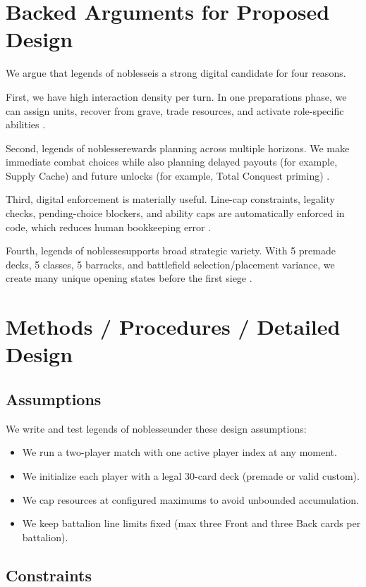 \documentclass[12pt]{article}
\newcommand{\GameName}{legends of noblesse}
\begin{document}
\section{Backed Arguments for Proposed Design}
We argue that \GameName is a strong digital candidate for four reasons.

First, we have high interaction density per turn. In one preparations phase, we can assign units, recover from grave, trade resources, and activate role-specific abilities \cite{engine,gameui}.

Second, \GameName rewards planning across multiple horizons. We make immediate combat choices while also planning delayed payouts (for example, Supply Cache) and future unlocks (for example, Total Conquest priming) \cite{engine}.

Third, digital enforcement is materially useful. Line-cap constraints, legality checks, pending-choice blockers, and ability caps are automatically enforced in code, which reduces human bookkeeping error \cite{engine,models,player}.

Fourth, \GameName supports broad strategic variety. With 5 premade decks, 5 classes, 5 barracks, and battlefield selection/placement variance, we create many unique opening states before the first siege \cite{premadedecks,selectui}.

\section{Methods / Procedures / Detailed Design}
\subsection{Assumptions}
We write and test \GameName under these design assumptions:
\begin{itemize}
    \item We run a two-player match with one active player index at any moment.
    \item We initialize each player with a legal 30-card deck (premade or valid custom).
    \item We cap resources at configured maximums to avoid unbounded accumulation.
    \item We keep battalion line limits fixed (max three Front and three Back cards per battalion).
\end{itemize}

\subsection{Constraints}
\end{document}
